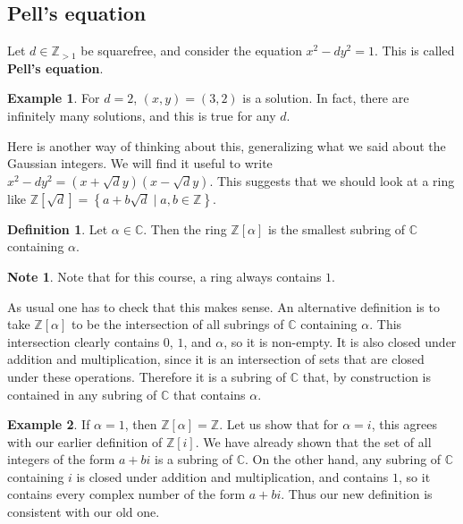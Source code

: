 \documentclass{article}
\newcommand{\Z}{\mathbb{Z}}
\newcommand{\C}{\mathbb{C}}
\newcommand{\rb}[1]{\left( #1 \right)}
\renewcommand{\sb}[1]{\left[ #1 \right]}
\newcommand{\cb}[1]{\left\{ #1 \right\}}
\theoremstyle{definition}\newtheorem{definition}{Definition}
\theoremstyle{definition}\newtheorem{remark}[definition]{Remark}
\theoremstyle{definition}\newtheorem*{example}{Example}
\theoremstyle{definition}\newtheorem*{note}{Note}
\begin{document}
\subsection{Pell's equation}

Let $ d \in \Z_{> 1} $ be squarefree, and consider the equation $ x^2 - dy^2 = 1 $. This is called \textbf{Pell's equation}.

\begin{example}
For $ d = 2 $, $ \rb{x, y} = \rb{3, 2} $ is a solution. In fact, there are infinitely many solutions, and this is true for any $ d $.
\end{example}

Here is another way of thinking about this, generalizing what we said about the Gaussian integers. We will find it useful to write $ x^2 - dy^2 = \rb{x + \sqrt{d}y}\rb{x - \sqrt{d}y} $. This suggests that we should look at a ring like $ \Z\sb{\sqrt{d}} = \cb{a + b\sqrt{d} \mid a, b \in \Z} $.

\begin{definition}
Let $ \alpha \in \C $. Then the ring $ \Z\sb{\alpha} $ is the smallest subring of $ \C $ containing $ \alpha $.
\end{definition}

\begin{note}
Note that for this course, a ring always contains $ 1 $.
\end{note}

As usual one has to check that this makes sense. An alternative definition is to take $ \Z\sb{\alpha} $ to be the intersection of all subrings of $ \C $ containing $ \alpha $. This intersection clearly contains $ 0 $, $ 1 $, and $ \alpha $, so it is non-empty. It is also closed under addition and multiplication, since it is an intersection of sets that are closed under these operations. Therefore it is a subring of $ \C $ that, by construction is contained in any subring of $ \C $ that contains $ \alpha $.

\begin{example}
If $ \alpha = 1 $, then $ \Z\sb{\alpha} = \Z $. Let us show that for $ \alpha = i $, this agrees with our earlier definition of $ \Z\sb{i} $. We have already shown that the set of all integers of the form $ a + bi $ is a subring of $ \C $. On the other hand, any subring of $ \C $ containing $ i $ is closed under addition and multiplication, and contains $ 1 $, so it contains every complex number of the form $ a + bi $. Thus our new definition is consistent with our old one.
\end{example}
\end{document}
